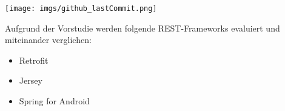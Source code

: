 \documentclass[a4paper,11pt,german,public]{INSOexpose}
\begin{document}
\begin{minipage}{\textwidth} 
	\centering	
	\texttt{[image: imgs/github\_lastCommit.png]}
	\label{figure:githubLastCommit}
	\vspace{5ex}
\end{minipage}

Aufgrund der Vorstudie werden folgende REST-Frameworks evaluiert und miteinander verglichen:

\begin{itemize}
	\item Retrofit 
	\item Jersey
	\item Spring for Android
\end{itemize}

\newpage
\end{document}
